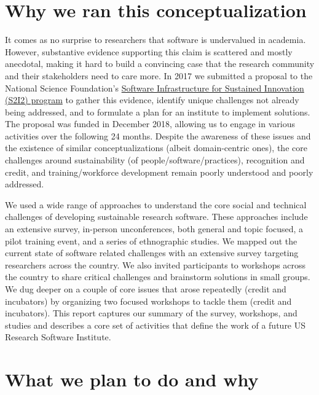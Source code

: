 \documentclass[
]{book}
\begin{document}
\hypertarget{why-we-ran-this-conceptualization}{%
\section{Why we ran this conceptualization}\label{why-we-ran-this-conceptualization}}

It comes as no surprise to researchers that software is undervalued in academia. However, substantive evidence supporting this claim is scattered and mostly anecdotal, making it hard to build a convincing case that the research community and their stakeholders need to care more. In 2017 we submitted a proposal to the National Science Foundation's \href{https://www.nsf.gov/pubs/2015/nsf15553/nsf15553.htm}{Software Infrastructure for Sustained Innovation (S2I2) program} to gather this evidence, identify unique challenges not already being addressed, and to formulate a plan for an institute to implement solutions. The proposal was funded in December 2018, allowing us to engage in various activities over the following 24 months. Despite the awareness of these issues and the existence of similar conceptualizations (albeit domain-centric ones), the core challenges around sustainability (of people/software/practices), recognition and credit, and training/workforce development remain poorly understood and poorly addressed.

We used a wide range of approaches to understand the core social and technical challenges of developing sustainable research software. These approaches include an extensive survey, in-person unconferences, both general and topic focused, a pilot training event, and a series of ethnographic studies. We mapped out the current state of software related challenges with an extensive survey targeting researchers across the country. We also invited participants to workshops across the country to share critical challenges and brainstorm solutions in small groups. We dug deeper on a couple of core issues that arose repeatedly (credit and incubators) by organizing two focused workshops to tackle them (credit and incubators). This report captures our summary of the survey, workshops, and studies and describes a core set of activities that define the work of a future US Research Software Institute.

\hypertarget{what-we-plan-to-do-and-why}{%
\section{What we plan to do and why}\label{what-we-plan-to-do-and-why}}
\end{document}
